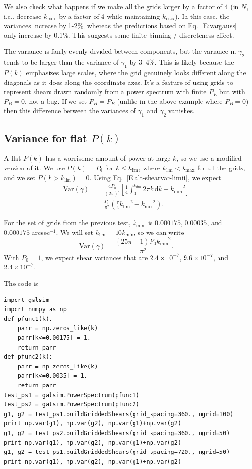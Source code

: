 \documentclass[preprint]{aastex}
\newcommand{\klim}{\ensuremath{k_\mathrm{lim}}}
\newcommand{\kmax}{\ensuremath{k_\mathrm{max}}}
\newcommand{\kmin}{\ensuremath{k_\mathrm{min}}}
\newcommand{\rmd}{\ensuremath{\mathrm{d}}}
\newcommand{\beq}{\begin{equation}}
\newcommand{\eeq}{\end{equation}}
\begin{document}
We also check what happens if we make all the grids larger by a factor
of 4 (in $N$, i.e., decrease \kmin\ by a factor of 4 while maintaining
\kmax).  In this case, the variances increase by 1-2\%, whereas the 
predictions  based on Eq.~\ref{E:vargauss} only increase by 0.1\%.
This suggests some finite-binning / discreteness effect.

The variance is fairly evenly divided between components, but the
variance in $\gamma_2$ tends to be larger than the variance of
$\gamma_1$ by 3--4\%.  This is
likely because the $P(k)$ emphasizes large scales, where the grid
genuinely looks different along the diagonals as it does along the
coordinate axes.  It's a feature of using grids to represent shears
drawn randomly from a power spectrum with finite $P_E$ but with
$P_B=0$, not a bug. If we set $P_B=P_E$ (unlike in the above example 
where $P_B=0$) then this difference between the variances of
$\gamma_1$ and $\gamma_2$ vanishes.

\subsection{Variance for flat $P(k)$}

A flat $P(k)$ has a worrisome amount of power at large $k$, so we use
a modified version of it: We use $P(k)=P_0$ for $k\le$\klim, where
$\klim<\kmax$ for all the grids; and we set $P(k>\klim)=0$. Using
Eq.~\ref{E:alt-shearvar-limit}, we expect
\begin{align}
\mathrm{Var}(\gamma) &= \frac{4P_0}{(2\pi)^2}
\left[\frac{1}{4}\int_{0}^{\klim} 2\pi k\,\rmd k - \kmin^2\right] \\
 &= \frac{P_0}{\pi^2} \left(\frac{\pi}{4} \klim^2 - \kmin^2\right).
\end{align}

For the set of grids from the previous test, \kmin\ is
$0.000175$, $0.00035$, and $0.000175$ arcsec$^{-1}$.  We will set $\klim=10\kmin$,
so we can write
\beq
\mathrm{Var}(\gamma) = \frac{(25\pi-1) P_0 \kmin^2}{\pi^2}.
\eeq
With $P_0=1$, we expect
shear variances that are $2.4\times 10^{-7}$, $9.6\times 10^{-7}$,
and $2.4\times 10^{-7}$.

The code is
\begin{verbatim}
import galsim
import numpy as np
def pfunc1(k):
    parr = np.zeros_like(k)
    parr[k<=0.00175] = 1.
    return parr
def pfunc2(k):
    parr = np.zeros_like(k)
    parr[k<=0.0035] = 1.
    return parr
test_ps1 = galsim.PowerSpectrum(pfunc1)
test_ps2 = galsim.PowerSpectrum(pfunc2)
g1, g2 = test_ps1.buildGriddedShears(grid_spacing=360., ngrid=100)
print np.var(g1), np.var(g2), np.var(g1)+np.var(g2)
g1, g2 = test_ps2.buildGriddedShears(grid_spacing=360., ngrid=50)
print np.var(g1), np.var(g2), np.var(g1)+np.var(g2)
g1, g2 = test_ps1.buildGriddedShears(grid_spacing=720., ngrid=50)
print np.var(g1), np.var(g2), np.var(g1)+np.var(g2)
\end{verbatim}
\end{document}
